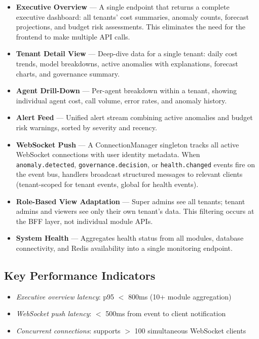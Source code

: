 \documentclass[12pt,a4paper,twoside]{report}
\newcommand{\kpi}[1]{\textit{\textcolor{accentgreen}{#1}}}
\begin{document}
\begin{itemize}
  \item \textbf{Executive Overview} — A single endpoint that returns a complete executive dashboard: all tenants' cost summaries, anomaly counts, forecast projections, and budget risk assessments. This eliminates the need for the frontend to make multiple API calls.

  \item \textbf{Tenant Detail View} — Deep-dive data for a single tenant: daily cost trends, model breakdowns, active anomalies with explanations, forecast charts, and governance summary.

  \item \textbf{Agent Drill-Down} — Per-agent breakdown within a tenant, showing individual agent cost, call volume, error rates, and anomaly history.

  \item \textbf{Alert Feed} — Unified alert stream combining active anomalies and budget risk warnings, sorted by severity and recency.

  \item \textbf{WebSocket Push} — A ConnectionManager singleton tracks all active WebSocket connections with user identity metadata. When \texttt{anomaly.detected}, \texttt{governance.decision}, or \texttt{health.changed} events fire on the event bus, handlers broadcast structured messages to relevant clients (tenant-scoped for tenant events, global for health events).

  \item \textbf{Role-Based View Adaptation} — Super admins see all tenants; tenant admins and viewers see only their own tenant's data. This filtering occurs at the BFF layer, not individual module APIs.

  \item \textbf{System Health} — Aggregates health status from all modules, database connectivity, and Redis availability into a single monitoring endpoint.
\end{itemize}

\subsection{Key Performance Indicators}
\begin{itemize}
  \item \kpi{Executive overview latency}: p95 $<$ 800ms (10+ module aggregation)
  \item \kpi{WebSocket push latency}: $<$ 500ms from event to client notification
  \item \kpi{Concurrent connections}: supports $>$ 100 simultaneous WebSocket clients
\end{itemize}
\end{document}
